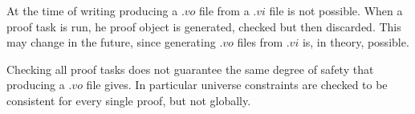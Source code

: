 At the time of writing producing a $.vo$ file from a $.vi$ file is not
possible.  When a proof task is run, he proof object is generated, checked but
then discarded.  This may change in the future, since generating $.vo$ files
from $.vi$ is, in theory, possible.  

Checking all proof tasks does not guarantee the same degree of safety
that producing a $.vo$ file gives.  In particular universe constraints
are checked to be consistent for every single proof, but not globally.

